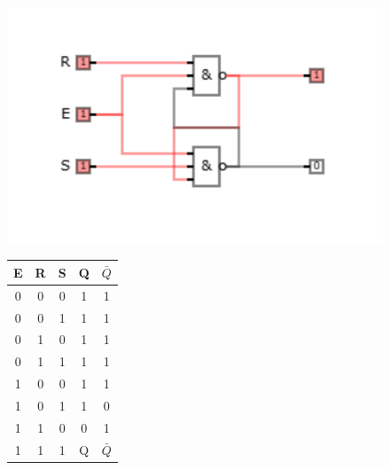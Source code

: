 \documentclass[12pt]{article}
\begin{document}
\begin{figure}[h!]
    \begin{minipage}{0.45\textwidth}
        \includegraphics[scale=0.5]{Schema5.png}
    \end{minipage}
    \hfill
    \begin{minipage}{0.3\textwidth}
        \begin{tabular}{|c|c|c|c|c|}
            \hline
            E & R & S & Q & $\bar{Q}$ \\ \hline
            0 & 0 & 0 & 1 & 1 \\ \hline
            0 & 0 & 1 & 1 & 1 \\ \hline
            0 & 1 & 0 & 1 & 1 \\ \hline
            0 & 1 & 1 & 1 & 1 \\ \hline
            1 & 0 & 0 & 1 & 1 \\ \hline
            1 & 0 & 1 & 1 & 0 \\ \hline
            1 & 1 & 0 & 0 & 1 \\ \hline
            1 & 1 & 1 & Q & $\bar{Q}$ \\ \hline
        \end{tabular}
    \end{minipage}
\end{figure}
\end{document}
